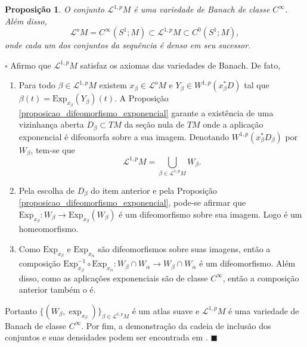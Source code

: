 \documentclass[12pt]{book}
\newtheorem{proposicao}[teorema]{Proposição}
\newenvironment{prova}[1]{$\square$ #1}{\hfill$\blacksquare$}
\newcommand{\caminhosexponenciaisSobolev}{\mathcal{L}^{1,p}M}
\newcommand{\circulo}{S^{1}}
\newcommand{\espacosobolev}[1]{W^{1,p}(#1)}
\newcommand{\Exp}{\text{Exp}}
\newcommand{\lacocontrateis}{\mathcal{L}^{o}M}
\begin{document}
	\begin{proposicao}\label{proposicao_caminhos_variedade_banach}
		O conjunto $\caminhosexponenciaisSobolev$ é uma variedade de Banach de classe $C^{\infty}$. Além disso, 
		$$
		\lacocontrateis = C^{\infty}(\circulo;M) \subset  \caminhosexponenciaisSobolev\subset C^{0}(\circulo;M),
		$$
		onde cada um dos conjuntos da sequência é denso em seu sucessor.
	\end{proposicao}
	\begin{prova}
		Afirmo que $\caminhosexponenciaisSobolev$ satisfaz os axiomas das variedades de Banach. De fato,
		\begin{enumerate}
			\item Para todo $\beta \in \caminhosexponenciaisSobolev $ existem $x_{\beta} \in \lacocontrateis$ e $Y_{\beta} \in \espacosobolev{x_{\beta}^{*}D}$ tal que $\beta(t)=\Exp_{x_{\beta}}(Y_{\beta})(t)$. A Proposição \ref{proposicao_difeomorfismo_exponencial} garante a existência de uma vizinhança aberta $D_{\beta} \subset TM$ da seção nula de $TM$ onde a aplicação exponencial é difeomorfa sobre a sua imagem. Denotando $\espacosobolev{x_{\beta}^{*}D_{\beta}}$ por $W_{\beta}$, tem-se que
			$$
			\caminhosexponenciaisSobolev = \bigcup_{\beta \in \caminhosexponenciaisSobolev } W_{\beta}.
			$$
			
			\item Pela escolha de $D_{\beta}$ do item anterior e pela Proposição \ref{proposicao_difeomorfismo_exponencial}, pode-se afirmar que $\Exp_{x_{\beta}}:W_{\beta} \to \Exp_{x_{\beta}}(W_{\beta})$ é um difeomorfismo sobre sua imagem. Logo é um homeomorfismo.
			
			\item Como $\Exp_{x_{\beta}}$ e $\Exp_{x_{\alpha}}$ são difeomorfismos sobre suas imagens, então a composição $\Exp_{x_{\beta}}^{-1} \circ \Exp_{x_{\alpha}} :W_{\beta} \cap W_{\alpha} \to W_{\beta} \cap W_{\alpha}$ é um difeomorfismo. Além disso, como as aplicações exponenciais são de classe $C^{\infty}$, então a composição anterior também o é.
		\end{enumerate}
		
		Portanto $\{(W_{\beta}, \exp_{x_{\beta}}) \}_{\beta \in \caminhosexponenciaisSobolev}$ é um atlas suave e $\caminhosexponenciaisSobolev$ é uma variedade de Banach de classe $C^{\infty}$. Por fim, a demonstração da cadeia de inclusão dos conjuntos e suas densidades podem ser encontrada em \cite{matthias_morse_homology}.
	\end{prova}
	
\end{document}
